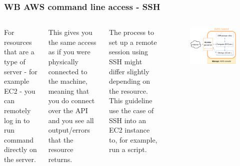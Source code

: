 \documentclass[aspectratio=169]{beamer} %
\begin{document}
\begin{frame}
	\frametitle{WB AWS command line access - SSH}
	\begin{columns}[c]
		For resources that are a type of server - for example EC2 -
		you can remotely log in 
		to run command directly on the server. 
		
		\vspace{.5cm}
		
		This gives you the same access as if 
		you were physically connected to the machine, 
		meaning that you do connect over the API and 
		you see all output/errors that the resource returns.
		
		\vspace{.5cm}
		
		The process to set up a remote session using SSH
		might differ slightly depending on the resource.
		This guideline use the case of SSH into 
		an EC2 instance to, for example, run a script.

		\begin{figure}
			\centering
			\includegraphics[width=\textwidth]{./img/wb-aws.png}
		\end{figure}

	\end{columns}
\end{frame}
\end{document}
